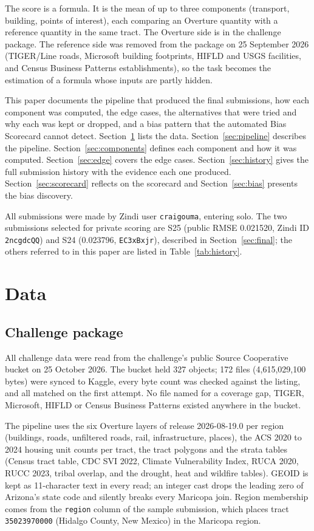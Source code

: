 \documentclass[11pt]{article}
\newcommand{\zindiuser}{\texttt{craigouma}}
\begin{document}
The score is a formula. It is the mean of up to three components (transport,
building, points of interest), each comparing an Overture quantity with a
reference quantity in the same tract. The Overture side is in the challenge
package. The reference side was removed from the package on 25 September 2026
(TIGER/Line roads, Microsoft building footprints, HIFLD and USGS facilities,
and Census Business Patterns establishments), so the task becomes the
estimation of a formula whose inputs are partly hidden.

This paper documents the pipeline that produced the final submissions, how
each component was computed, the edge cases, the alternatives that were tried
and why each was kept or dropped, and a bias pattern that the automated Bias
Scorecard cannot detect. Section~\ref{sec:data} lists the data.
Section~\ref{sec:pipeline} describes the pipeline.
Section~\ref{sec:components} defines each component and how it was computed.
Section~\ref{sec:edge} covers the edge cases. Section~\ref{sec:history} gives
the full submission history with the evidence each one produced.
Section~\ref{sec:scorecard} reflects on the scorecard and
Section~\ref{sec:bias} presents the bias discovery.

All submissions were made by Zindi user \zindiuser{}, entering solo.
The two submissions selected for private scoring are S25 (public RMSE
0.021520, Zindi ID \texttt{2ncgdcQQ}) and S24 (0.023796, \texttt{EC3xBxjr}),
described in Section~\ref{sec:final}; the
others referred to in this paper are listed in Table~\ref{tab:history}.

\section{Data}
\label{sec:data}

\subsection{Challenge package}

All challenge data were read from the challenge's public Source Cooperative
bucket \cite{bucket} on 25 October 2026. The bucket held 327 objects; 172 files (4,615,029,100 bytes)
were synced to Kaggle, every byte count was checked against the listing, and
all matched on the first attempt. No file named for a coverage gap, TIGER,
Microsoft, HIFLD or Census Business Patterns existed anywhere in the bucket.

The pipeline uses the six Overture layers of release 2026-08-19.0 per region
(buildings, roads, unfiltered roads, rail, infrastructure, places), the ACS
2020 to 2024 housing unit counts per tract, the tract polygons and the strata
tables (Census tract table, CDC SVI 2022, Climate Vulnerability Index, RUCA
2020, RUCC 2023, tribal overlap, and the drought, heat and wildfire tables).
GEOID is kept as 11-character text in every read; an integer cast drops the
leading zero of Arizona's state code and silently breaks every Maricopa join.
Region membership comes from the \texttt{region} column of the sample
submission, which places tract \texttt{35023970000} (Hidalgo County, New
Mexico) in the Maricopa region.
\end{document}
